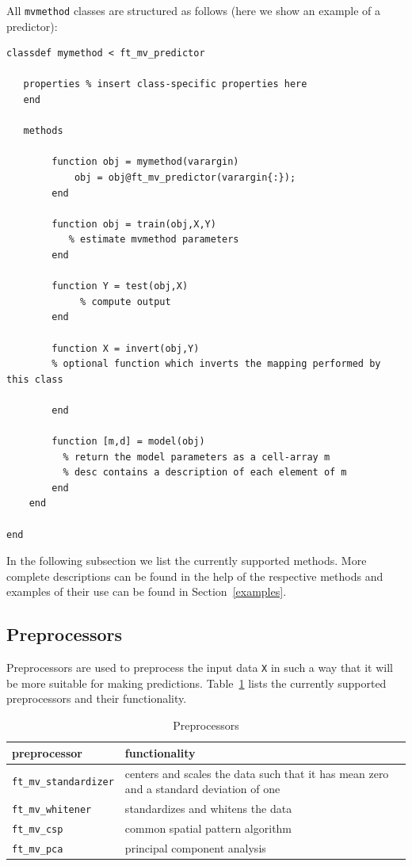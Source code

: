 \documentclass{article}
\renewcommand{\t}[1]{{\tt #1}}
\begin{document}
All \t{mvmethod} classes are structured as follows (here we show an example of a predictor):
\begin{verbatim}
classdef mymethod < ft_mv_predictor
 
   properties % insert class-specific properties here
   end
 
   methods
 
        function obj = mymethod(varargin)       
         	obj = obj@ft_mv_predictor(varargin{:});
        end        
 
        function obj = train(obj,X,Y)
           % estimate mvmethod parameters
        end
 
        function Y = test(obj,X)
        	 % compute output     
        end
 	
        function X = invert(obj,Y)
        % optional function which inverts the mapping performed by this class
        
        end
 
        function [m,d] = model(obj)
          % return the model parameters as a cell-array m
          % desc contains a description of each element of m 
        end
    end
 
end
\end{verbatim}

In the following subsection we list the currently supported methods. More complete descriptions can be found in the help of the respective methods and examples of their use can be found in Section~\ref{examples}.

\subsection{Preprocessors}

Preprocessors are used to preprocess the input data \t{X} in such a way that it will be more suitable for making predictions. Table~\ref{preprocessors} lists the currently supported preprocessors and their functionality.

\begin{table}[ht]
\centering
\caption{Preprocessors}
\begin{tabular}{p{}|p{}}
\bf{preprocessor} & \bf{functionality}\\
\hline
\t{ft\_mv\_standardizer} &  centers and scales the data such that it has mean zero and a standard deviation of one\\
\t{ft\_mv\_whitener} & standardizes and whitens the data\\
\t{ft\_mv\_csp} & common spatial pattern algorithm\\
\t{ft\_mv\_pca} & principal component analysis
\end{tabular}
\label{preprocessors}
\end{table}
\end{document}
